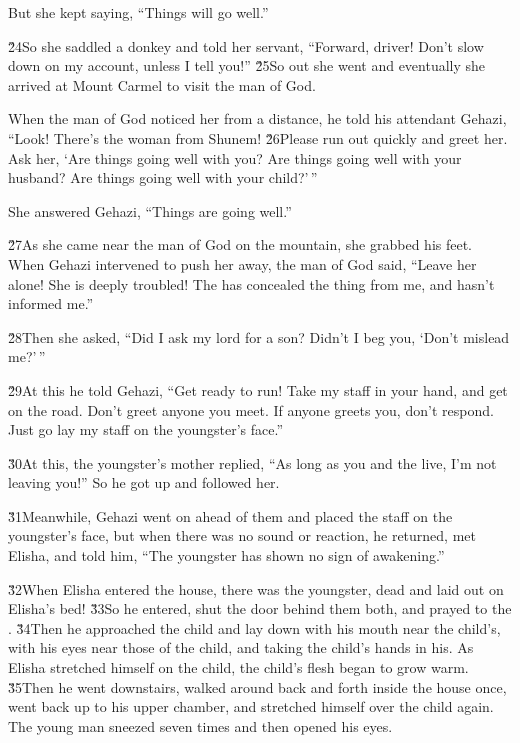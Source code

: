 But she kept saying, ``Things will go well.''

\v{24}So she saddled a donkey and told her servant, ``Forward, driver! Don't slow down on my account, unless I tell you!'' \v{25}So out she went and eventually she arrived at Mount Carmel to visit the man of God.

When the man of God noticed her from a distance, he told his attendant Gehazi, ``Look! There's the woman from Shunem! \v{26}Please run out quickly and greet her. Ask her, `Are things going well with you? Are things going well with your husband? Are things going well with your child?'\,''

She answered Gehazi, ``Things are going well.''

\v{27}As she came near the man of God on the mountain, she grabbed his feet. When Gehazi intervened to push her away, the man of God said, ``Leave her alone! She is deeply troubled! The  has concealed the thing from me, and hasn't informed me.''

\v{28}Then she asked, ``Did I ask my lord for a son? Didn't I beg you, `Don't mislead me?'\,''

\v{29}At this he told Gehazi, ``Get ready to run! Take my staff in your hand, and get on the road. Don't greet anyone you meet. If anyone greets you, don't respond. Just go lay my staff on the youngster's face.''

\v{30}At this, the youngster's mother replied, ``As long as you and the  live, I'm not leaving you!'' So he got up and followed her.

\v{31}Meanwhile, Gehazi went on ahead of them and placed the staff on the youngster's face, but when there was no sound or reaction, he returned, met Elisha, and told him, ``The youngster has shown no sign of awakening.''

\v{32}When Elisha entered the house, there was the youngster, dead and laid out on Elisha's bed! \v{33}So he entered, shut the door behind them both, and prayed to the . \v{34}Then he approached the child and lay down with his mouth near the child's, with his eyes near those of the child, and taking the child's hands in his. As Elisha stretched himself on the child, the child's flesh began to grow warm. \v{35}Then he went downstairs, walked around back and forth inside the house once, went back up to his upper chamber, and stretched himself over the child again. The young man sneezed seven times and then opened his eyes.


